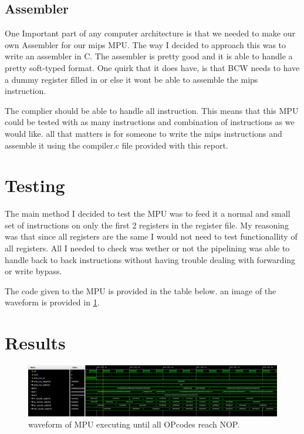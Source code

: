 \documentclass{article}
\begin{document}
\subsection{Assembler}

One Important part of any computer architecture is that we needed to make our own Assembler for our mips MPU. The way I decided to approach this was to write an assembler in C. The assembler is pretty good and it is able to handle a pretty soft-typed format. One quirk that it does have, is that BCW needs to have a dummy register filled in or else it wont be able to assemble the mips instruction.

The complier should be able to handle all instruction. This means that this MPU could be tested with as many instructions and combination of instructions as we would like. all that matters is for someone to write the mips instructions and assemble it using the compiler.c file provided with this report.

\section{Testing}

The main method I decided to test the MPU was to feed it a normal and small set of instructions on only the first 2 registers in the register file. My reasoning was that since all registers are the same I would not need to test functionallity of all registers. All I needed to check was wether or not the pipelining was able to handle back to back instructions without having trouble dealing with forwarding or write bypass.

The code given to the MPU is provided in the table below. an image of the waveform is provided in \ref{fig:waveform}.

\section{Results}

\begin{figure}
	\centering
	\includegraphics[width=1\linewidth]{imageOP.png}
	\caption{waveform of MPU executing until all OPcodes reach NOP.}
	\label{fig:waveform}
\end{figure}
\end{document}
